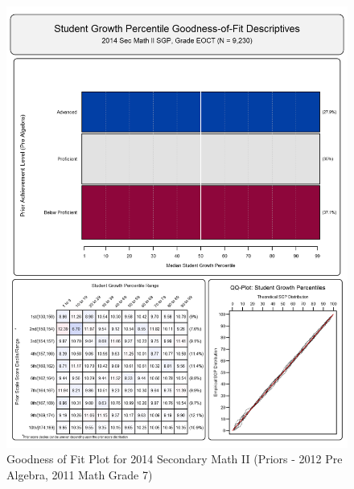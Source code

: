 \documentclass[12pt]{article}
\begin{document}
\begin{figure}[htbp]
\centering
\includegraphics{../img/Goodness_of_Fit/SEC_MATH_II.2014/2014_SEC_MATH_II_EOCT;2012_PRE_ALGEBRA_EOCT;2011_MATH_7.png}
\caption{Goodness of Fit Plot for 2014 Secondary Math II (Priors - 2012
Pre Algebra, 2011 Math Grade 7)}
\end{figure}
\end{document}
